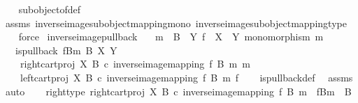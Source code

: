 \begin{isabellebody}
%
\isadelimproof
\ \ %
\endisadelimproof
%
\isatagproof
{}\isamarkupfalse%
\ subobject{\isacharunderscore}{\kern0pt}of{\isacharunderscore}{\kern0pt}def{}\isanewline
\ \ \isamarkupfalse%
\ assms\ inverse{\isacharunderscore}{\kern0pt}image{\isacharunderscore}{\kern0pt}subobject{\isacharunderscore}{\kern0pt}mapping{\isacharunderscore}{\kern0pt}mono\ inverse{\isacharunderscore}{\kern0pt}image{\isacharunderscore}{\kern0pt}subobject{\isacharunderscore}{\kern0pt}mapping{\isacharunderscore}{\kern0pt}type\isanewline
\ \ \isamarkupfalse%
\ force%
\endisatagproof
{\isafoldproof}%
%
\isadelimproof
\isanewline
%
\endisadelimproof
\isanewline
{}\isamarkupfalse%
\ inverse{\isacharunderscore}{\kern0pt}image{\isacharunderscore}{\kern0pt}pullback{\isacharcolon}{\kern0pt}\isanewline
\ \ \ {\isachardoublequoteopen}m\ {\isacharcolon}{\kern0pt}\ B\ {\isasymrightarrow}\ Y{\isachardoublequoteclose}\ {\isachardoublequoteopen}f\ {\isacharcolon}{\kern0pt}\ X\ {\isasymrightarrow}\ Y{\isachardoublequoteclose}\ {\isachardoublequoteopen}monomorphism\ m{\isachardoublequoteclose}\isanewline
\ \ \ {\isachardoublequoteopen}is{\isacharunderscore}{\kern0pt}pullback\ {\isacharparenleft}{\kern0pt}f\isactrlsup {\isacharminus}{\kern0pt}B{\isasymrparr}\isactrlbsub m\isactrlesub {\isacharparenright}{\kern0pt}\ B\ X\ Y\ \isanewline
\ \ \ \ {\isacharparenleft}{\kern0pt}right{\isacharunderscore}{\kern0pt}cart{\isacharunderscore}{\kern0pt}proj\ X\ B\ {\isasymcirc}\isactrlsub c\ inverse{\isacharunderscore}{\kern0pt}image{\isacharunderscore}{\kern0pt}mapping\ f\ B\ m{\isacharparenright}{\kern0pt}\ m\isanewline
\ \ \ \ {\isacharparenleft}{\kern0pt}left{\isacharunderscore}{\kern0pt}cart{\isacharunderscore}{\kern0pt}proj\ X\ B\ {\isasymcirc}\isactrlsub c\ inverse{\isacharunderscore}{\kern0pt}image{\isacharunderscore}{\kern0pt}mapping\ f\ B\ m{\isacharparenright}{\kern0pt}\ f{\isachardoublequoteclose}\isanewline
%
\isadelimproof
\ \ %
\endisadelimproof
%
\isatagproof
{}\isamarkupfalse%
\ is{\isacharunderscore}{\kern0pt}pullback{\isacharunderscore}{\kern0pt}def\ \isamarkupfalse%
\ assms\isanewline
{}\isamarkupfalse%
\ auto\isanewline
\ \ \isamarkupfalse%
\ right{\isacharunderscore}{\kern0pt}type{\isacharcolon}{\kern0pt}\ {\isachardoublequoteopen}right{\isacharunderscore}{\kern0pt}cart{\isacharunderscore}{\kern0pt}proj\ X\ B\ {\isasymcirc}\isactrlsub c\ inverse{\isacharunderscore}{\kern0pt}image{\isacharunderscore}{\kern0pt}mapping\ f\ B\ m\ {\isacharcolon}{\kern0pt}\ f\isactrlsup {\isacharminus}{\kern0pt}B{\isasymrparr}\isactrlbsub m\isactrlesub \ {\isasymrightarrow}\ B{\isachardoublequoteclose}\isanewline

\end{isabellebody}
